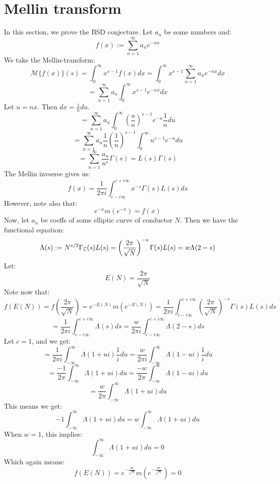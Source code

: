 \documentclass[a4paper]{amsart}
\begin{document}
\section{Mellin transform}
In this section, we prove the BSD conjecture. Let $a_n$ be some numbers and:
$$f(x) := \sum_{n = 1}^\infty a_n e^{-nx}$$
We take the Mellin-transform: 
$$\mathcal{M}\{f(x)\}(s) = \int_0^\infty x^{s - 1} f(x) dx = \int_0^\infty x^{s - 1} \sum_{n = 1}^\infty a_n e^{-nx} dx$$
$$ = \sum_{n = 1}^\infty a_n \int_0^\infty x^{s - 1} e^{-nx} dx$$
Let $u = nx$. Then $dx = \frac{1}{n} du$.
$$ = \sum_{n = 1}^\infty a_n \int_0^\infty \left(\frac{u}{n}\right)^{s - 1} e^{-u} \frac{1}{n} du$$
$$ = \sum_{n = 1}^\infty a_n \frac{1}{n} \left(\frac{1}{n}\right)^{s - 1} \int_0^\infty u^{s - 1} e^{-u} du$$
$$ = \sum_{n = 1}^\infty \frac{a_n}{n^s} \Gamma(s) = L(s) \Gamma(s)$$
The Mellin invserse gives us: 
$$f(x) = \frac{1}{2\pi i}\int_{c - i \infty}^{c + i \infty} x^{-s} \Gamma(s) L(s)ds$$
However, note also that:
$$e^{-x}m(e^{-x}) = f(x)$$
Now, let $a_n$ be coeffs of some elliptic curve of conductor $N$. Then we have the functional equation:
$$\Lambda(s) := N^{s/2} \Gamma_{\mathbb{C}}(s) L(s) = \left(\frac{2\pi}{\sqrt{N}}\right)^{-s} \Gamma(s) L(s) = w\Lambda(2 - s)$$
Let:
$$E(N) = \frac{2\pi}{\sqrt{N}}$$
Note now that:
$$ f(E(N)) = f\left(\frac{2\pi}{\sqrt{N}}\right) = e^{-E(N)} m\left(e^{-E(N)}\right) = \frac{1}{2\pi i} \int_{c - i \infty}^{c + i \infty} \left(\frac{2\pi}{\sqrt{N}}\right)^{-s} \Gamma(s) L(s)ds$$
$$ = \frac{1}{2\pi i} \int_{c - i \infty}^{c + i \infty} \Lambda(s) ds = \frac{w}{2\pi i}\int_{c - i \infty}^{c + i \infty} \Lambda(2 - s) ds$$
Let $c = 1$,  and we get:
$$ = \frac{1}{2\pi i} \int_{-\infty}^{\infty} \Lambda(1 + ui) \frac{1}{i}du = \frac{w}{2\pi i}\int_{-\infty}^{\infty} \Lambda(1 - ui) \frac{1}{i}du$$
$$ = \frac{-1}{2\pi} \int_{-\infty}^{\infty} \Lambda(1 + ui) du = \frac{-w}{2\pi}\int_{-\infty}^{\infty} \Lambda(1 - ui) du$$
$$ = \frac{w}{2\pi}\int_{-\infty}^{\infty} \Lambda(1 + ui) du$$
This means we get:
$$-1 \int_{-\infty}^{\infty} \Lambda(1 + ui) du = w\int_{-\infty}^{\infty} \Lambda(1 + ui) du$$
When $w = 1$, this implies:
$$\int_{-\infty}^{\infty} \Lambda(1 + ui) du = 0$$
Which again means: 
$$f(E(N)) = e^{-\frac{2\pi}{\sqrt{N}}} m\left(e^{-\frac{2\pi}{\sqrt{N}}}\right) = 0$$
\end{document}
